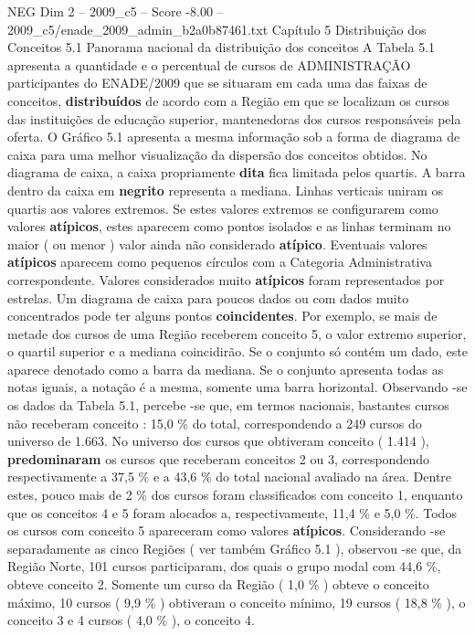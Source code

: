 \begin{textsample}{NEG Dim 2 – 2009\_c5 – Score -8.00 – 2009\_c5/enade\_2009\_admin\_b2a0b87461.txt}  \label{ex:f2_neg_006}
Capítulo 5 Distribuição dos Conceitos 5.1 Panorama nacional da distribuição dos conceitos A Tabela 5.1 apresenta a quantidade e o percentual de cursos de ADMINISTRAÇÃO participantes do ENADE/2009 que se situaram em cada uma das faixas de conceitos, \textbf{distribuídos} de acordo com a Região em que se localizam os cursos das instituições de educação superior, mantenedoras dos cursos responsáveis pela oferta.
O Gráfico 5.1 apresenta a mesma informação sob a forma de diagrama de caixa para uma melhor visualização da dispersão dos conceitos obtidos.
No diagrama de caixa, a caixa propriamente \textbf{dita} fica limitada pelos quartis.
A barra dentro da caixa em \textbf{negrito} representa a mediana.
Linhas verticais uniram os quartis aos valores extremos.
Se estes valores extremos se configurarem como valores \textbf{atípicos}, estes aparecem como pontos isolados e as linhas terminam no maior ( ou menor ) valor ainda não considerado \textbf{atípico}.
Eventuais valores \textbf{atípicos} aparecem como pequenos círculos com a Categoria Administrativa correspondente.
Valores considerados muito \textbf{atípicos} foram representados por estrelas.
Um diagrama de caixa para poucos dados ou com dados muito concentrados pode ter alguns pontos \textbf{coincidentes}.
Por exemplo, se mais de metade dos cursos de uma Região receberem conceito 5, o valor extremo superior, o quartil superior e a mediana coincidirão.
Se o conjunto só contém um dado, este aparece denotado como a barra da mediana.
Se o conjunto apresenta todas as notas iguais, a notação é a mesma, somente uma barra horizontal.
Observando -se os dados da Tabela 5.1, percebe -se que, em termos nacionais, bastantes cursos não receberam conceito : 15,0 \% do total, correspondendo a 249 cursos do universo de 1.663.
No universo dos cursos que obtiveram conceito ( 1.414 ), \textbf{predominaram} os cursos que receberam conceitos 2 ou 3, correspondendo respectivamente a 37,5 \% e a 43,6 \% do total nacional avaliado na área.
Dentre estes, pouco mais de 2 \% dos cursos foram classificados com conceito 1, enquanto que os conceitos 4 e 5 foram alocados a, respectivamente, 11,4 \% e 5,0 \%.
Todos os cursos com conceito 5 apareceram como valores \textbf{atípicos}.
Considerando -se separadamente as cinco Regiões ( ver também Gráfico 5.1 ), observou -se que, da Região Norte, 101 cursos participaram, dos quais o grupo modal com 44,6 \%, obteve conceito 2.
Somente um curso da Região ( 1,0 \% ) obteve o conceito máximo, 10 cursos ( 9,9 \% ) obtiveram o conceito mínimo, 19 cursos ( 18,8 \% ), o conceito 3 e 4 cursos ( 4,0 \% ), o conceito 4.

\end{textsample}
